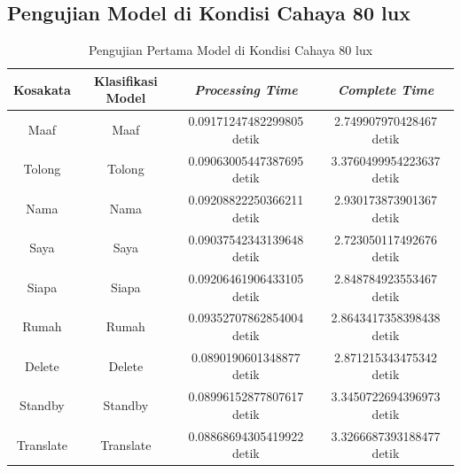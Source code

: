 \subsection{Pengujian Model di Kondisi Cahaya 80 lux}
\label{sec:analisiscahaya2}

\begin{longtable}{|c|c|c|c|}
  \caption{Pengujian Pertama Model di Kondisi Cahaya 80 lux}
  \label{tb:prediksiremang1}                                   \\
  \hline
  \rowcolor[HTML]{C0C0C0}
  \textbf{Kosakata} & \textbf{Klasifikasi Model} & \textbf{\emph{Processing Time}} & \textbf{\emph{Complete Time}}\\
  \hline
  Maaf              & Maaf                         & 0.09171247482299805 detik                           & 2.749907970428467 detik                                  \\
  Tolong            & Tolong                       & 0.09063005447387695 detik                           & 3.3760499954223637 detik                                   \\
  Nama              & Nama                         & 0.09208822250366211 detik                           & 2.930173873901367 detik                                  \\
  Saya              & Saya                         & 0.09037542343139648 detik                           & 2.723050117492676 detik                                  \\
  Siapa             & Siapa                        & 0.09206461906433105 detik                           & 2.848784923553467 detik                                  \\
  Rumah             & Rumah                        & 0.09352707862854004 detik                           & 2.8643417358398438 detik                                   \\
  Delete            & Delete                       & 0.0890190601348877 detik                            & 2.871215343475342 detik                                  \\
  Standby           & Standby                      & 0.08996152877807617 detik                           & 3.3450722694396973 detik                                   \\
  Translate         & Translate                    & 0.08868694305419922 detik                           & 3.3266687393188477 detik                                   \\
  \hline
\end{longtable}

